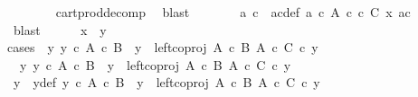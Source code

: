 \begin{isabellebody}
\ \ \ \ \ \ \isamarkupfalse%
\ cart{\isacharunderscore}{\kern0pt}prod{\isacharunderscore}{\kern0pt}decomp\ \isamarkupfalse%
\ blast\isanewline
\ \ \ \ \isamarkupfalse%
\ \isamarkupfalse%
\ a\ c\ \ ac{\isacharunderscore}{\kern0pt}def{\isacharcolon}{\kern0pt}\ {\isachardoublequoteopen}a\ {\isasymin}\isactrlsub c\ A{\isachardoublequoteclose}\ {\isachardoublequoteopen}c\ {\isasymin}\isactrlsub c\ C{\isachardoublequoteclose}\ {\isachardoublequoteopen}x{\isacharprime}{\kern0pt}\ {\isacharequal}{\kern0pt}{\isasymlangle}a{\isacharcomma}{\kern0pt}c{\isasymrangle}{\isachardoublequoteclose}\isanewline
\ \ \ \ \ \ \isamarkupfalse%
\ blast\isanewline
\ \ \ \ \isamarkupfalse%
\ {\isachardoublequoteopen}x\ {\isacharequal}{\kern0pt}\ y{\isachardoublequoteclose}\ \ \isanewline
\ \ \ \ \isamarkupfalse%
{\isacharparenleft}{\kern0pt}cases\ {\isachardoublequoteopen}{\isasymexists}\ y{\isacharprime}{\kern0pt}{\isachardot}{\kern0pt}\ y{\isacharprime}{\kern0pt}\ {\isasymin}\isactrlsub c\ A\ {\isasymtimes}\isactrlsub c\ B\ {\isasymand}\ y\ {\isacharequal}{\kern0pt}\ left{\isacharunderscore}{\kern0pt}coproj\ {\isacharparenleft}{\kern0pt}A\ {\isasymtimes}\isactrlsub c\ B{\isacharparenright}{\kern0pt}\ {\isacharparenleft}{\kern0pt}A\ {\isasymtimes}\isactrlsub c\ C{\isacharparenright}{\kern0pt}\ {\isasymcirc}\isactrlsub c\ y{\isacharprime}{\kern0pt}{\isachardoublequoteclose}{\isacharparenright}{\kern0pt}\isanewline
\ \ \ \ \ \ \isamarkupfalse%
\ {\isachardoublequoteopen}{\isasymexists}\ y{\isacharprime}{\kern0pt}{\isachardot}{\kern0pt}\ y{\isacharprime}{\kern0pt}\ {\isasymin}\isactrlsub c\ A\ {\isasymtimes}\isactrlsub c\ B\ {\isasymand}\ y\ {\isacharequal}{\kern0pt}\ left{\isacharunderscore}{\kern0pt}coproj\ {\isacharparenleft}{\kern0pt}A\ {\isasymtimes}\isactrlsub c\ B{\isacharparenright}{\kern0pt}\ {\isacharparenleft}{\kern0pt}A\ {\isasymtimes}\isactrlsub c\ C{\isacharparenright}{\kern0pt}\ {\isasymcirc}\isactrlsub c\ y{\isacharprime}{\kern0pt}{\isachardoublequoteclose}\isanewline
\ \ \ \ \ \ \isamarkupfalse%
\ \isamarkupfalse%
\ y{\isacharprime}{\kern0pt}\ \ y{\isacharprime}{\kern0pt}{\isacharunderscore}{\kern0pt}def{\isacharcolon}{\kern0pt}\ {\isachardoublequoteopen}y{\isacharprime}{\kern0pt}\ {\isasymin}\isactrlsub c\ A\ {\isasymtimes}\isactrlsub c\ B\ {\isasymand}\ y\ {\isacharequal}{\kern0pt}\ left{\isacharunderscore}{\kern0pt}coproj\ {\isacharparenleft}{\kern0pt}A\ {\isasymtimes}\isactrlsub c\ B{\isacharparenright}{\kern0pt}\ {\isacharparenleft}{\kern0pt}A\ {\isasymtimes}\isactrlsub c\ C{\isacharparenright}{\kern0pt}\ {\isasymcirc}\isactrlsub c\ y{\isacharprime}{\kern0pt}{\isachardoublequoteclose}\isanewline

\end{isabellebody}
